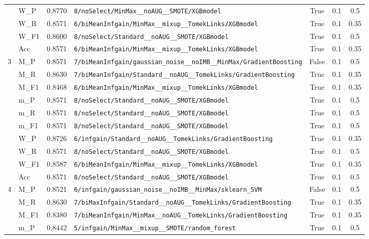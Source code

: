 \begin{table}[htbp]
\begin{tabular}{|c|l|c|>{\ttfamily\footnotesize}p{7.2cm}|c|c|c|}
 & W\_P & 0.8770 & \texttt{8/noSelect/MinMax\_\_noAUG\_\_SMOTE/XGBmodel} & True & 0.1 & 0.5 \\
 & W\_R & 0.8571 & \texttt{6/biMeanInfgain/MinMax\_\_mixup\_\_TomekLinks/XGBmodel} & True & 0.1 & 0.35 \\
 & W\_F1 & 0.8600 & \texttt{8/noSelect/Standard\_\_noAUG\_\_SMOTE/XGBmodel} & True & 0.1 & 0.5 \\
 & Acc & 0.8571 & \texttt{6/biMeanInfgain/MinMax\_\_mixup\_\_TomekLinks/XGBmodel} & True & 0.1 & 0.35 \\
\hline
\multirow{10}{*}{3} & M\_P & 0.8571 & \texttt{7/biMeanInfgain/gaussian\_noise\_\_noIMB\_\_MinMax/GradientBoosting} & False & 0.1 & 0.5 \\
 & M\_R & 0.8630 & \texttt{7/biMeanInfgain/Standard\_\_noAUG\_\_TomekLinks/GradientBoosting} & True & 0.1 & 0.35 \\
 & M\_F1 & 0.8468 & \texttt{6/biMeanInfgain/MinMax\_\_mixup\_\_TomekLinks/XGBmodel} & True & 0.1 & 0.35 \\
 & m\_P & 0.8571 & \texttt{8/noSelect/Standard\_\_noAUG\_\_SMOTE/XGBmodel} & True & 0.1 & 0.5 \\
 & m\_R & 0.8571 & \texttt{8/noSelect/Standard\_\_noAUG\_\_SMOTE/XGBmodel} & True & 0.1 & 0.5 \\
 & m\_F1 & 0.8571 & \texttt{8/noSelect/Standard\_\_noAUG\_\_SMOTE/XGBmodel} & True & 0.1 & 0.5 \\
 & W\_P & 0.8726 & \texttt{6/infgain/Standard\_\_noAUG\_\_TomekLinks/GradientBoosting} & True & 0.1 & 0.35 \\
 & W\_R & 0.8571 & \texttt{8/noSelect/Standard\_\_noAUG\_\_SMOTE/XGBmodel} & True & 0.1 & 0.5 \\
 & W\_F1 & 0.8587 & \texttt{6/biMeanInfgain/MinMax\_\_mixup\_\_TomekLinks/XGBmodel} & True & 0.1 & 0.35 \\
 & Acc & 0.8571 & \texttt{8/noSelect/Standard\_\_noAUG\_\_SMOTE/XGBmodel} & True & 0.1 & 0.5 \\
\hline
\multirow{10}{*}{4} & M\_P & 0.8521 & \texttt{6/infgain/gaussian\_noise\_\_noIMB\_\_MinMax/sklearn\_SVM} & False & 0.1 & 0.5 \\
 & M\_R & 0.8630 & \texttt{7/biMaxInfgain/Standard\_\_noAUG\_\_TomekLinks/GradientBoosting} & True & 0.1 & 0.35 \\
 & M\_F1 & 0.8380 & \texttt{7/biMeanInfgain/MinMax\_\_noAUG\_\_TomekLinks/GradientBoosting} & True & 0.1 & 0.35 \\
 & m\_P & 0.8442 & \texttt{5/infgain/MinMax\_\_mixup\_\_SMOTE/random\_forest} & True & 0.1 & 0.5 \\

\end{tabular}
\end{table}
